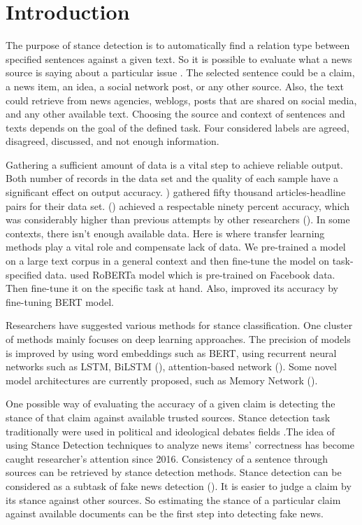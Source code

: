 

\section{Introduction}

The purpose of stance detection is to automatically find a relation type between specified sentences against a given text. So it is possible to evaluate what a news source is saying about a particular issue \cite{UCLMR}. The selected sentence could be a claim, a news item, an idea, a social network post, or any other source. Also, the text could retrieve from news agencies, weblogs, posts that are shared on social media, and any other available text. Choosing the source and context of sentences and texts depends on the goal of the defined task. Four considered labels are agreed, disagreed, discussed, and not enough information. 
\newline

Gathering a sufficient amount of data is a vital step to achieve reliable output. Both number of records in the data set and the quality of each sample have a significant effect on output accuracy. \cite{takestancefake}) gathered fifty thousand articles-headline pairs for their data set. (\cite{takestancefake}) achieved a respectable ninety percent accuracy, which was considerably higher than previous attempts by other researchers (\cite{book_fake}). In some contexts, there isn't enough available data. Here is where transfer learning methods play a vital role and compensate lack of data. We pre-trained a model on a large text corpus in a general context and then fine-tune the model on task-specified data. \cite{takestancefake} used RoBERTa model which is pre-trained on Facebook data. Then fine-tune it on the specific task at hand.
Also, \cite{stance_robust} improved its accuracy by fine-tuning BERT model.
\newline

Researchers have suggested various methods for stance classification. One cluster of methods mainly focuses on deep learning approaches. The precision of models is improved by using word embeddings such as BERT, using recurrent neural networks such as LSTM, BiLSTM (\cite{stanceCI}), attention-based network (\cite{stanceCI}). Some novel model architectures are currently proposed, such as Memory Network (\cite{memory_network}).
\newline

One possible way of evaluating the accuracy of a given claim is detecting the stance of that claim against available trusted sources. Stance detection task traditionally were used in political and ideological debates fields \citep{stance_robust}.The idea of using Stance Detection techniques to analyze news items' correctness has become caught researcher's attention since 2016. Consistency of a sentence through sources can be retrieved by stance detection methods. Stance detection can be considered as a subtask of fake news detection (\cite{book_datafake}). It is easier to judge a claim by its stance against other sources. So estimating the stance of a particular claim against available documents can be the first step into detecting fake news. 

